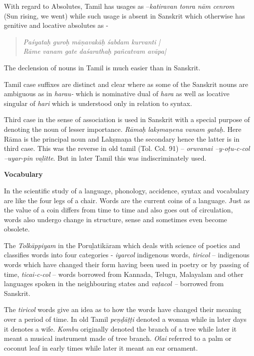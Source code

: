 With regard to Absolutes, Tamil has usages as –\textit{katiravan tonra nām cenrom} (Sun rising, we went) while such usage is absent in Sanskrit which otherwise has genitive and locative absolutes as -

\begin{verse}
\textit{Paśyataḥ guroḥ māṇavakāḥ śabdam kurvanti |}\\\textit{Rāme vanam gate daśarathaḥ pañcatvam avāpa|}
\end{verse}

The declension of nouns in Tamil is much easier than in Sanskrit.

Tamil case suffixes are distinct and clear where as some of the Sanskrit nouns are ambiguous as in \textit{harau-} which is nominative dual of \textit{hara} as well as locative singular of \textit{hari} which is understood only in relation to syntax.

Third case in the sense of association is used in Sanskrit with a special purpose of denoting the noun of lesser importance. \textit{Rāmaḥ lakṣmaṇena vanam gataḥ.} Here Rāma is the principal noun and Lakṣmaṇa the secondary hence the latter is in third case. This was the reverse in old tamil (Tol. Col. 91) – \textit{oruvanai –y-oṭu-c-col –uyar-pin vaḻitte}. But in later Tamil this was indiscriminately used.

\textbf{Vocabulary}

In the scientific study of a language, phonology, accidence, syntax and vocabulary are like the four legs of a chair. Words are the current coins of a language. Just as the value of a coin differs from time to time and also goes out of circulation, words also undergo change in structure, sense and sometimes even become obsolete.

The \textit{Tolkāppiyam} in the Poruḻatikāram which deals with science of poetics and classifies words into four categories - \textit{iyarcol} indigenous words, \textit{tiricol} – indigenous words which have changed their form having been used in poetry or by passing of time, \textit{ticai-c-col} – words borrowed from Kannada, Telugu, Malayalam and other languages spoken in the neighbouring states and \textit{vaṭacol –} borrowed from Sanskrit.

The \textit{tiricol} words give an idea as to how the words have changed their meaning over a period of time. In old Tamil \textit{peṇḍāṭṭi} denoted a woman while in later days it denotes a wife. \textit{Kombu} originally denoted the branch of a tree while later it meant a musical instrument made of tree branch. \textit{Olai} referred to a palm or coconut leaf in early times while later it meant an ear ornament.

